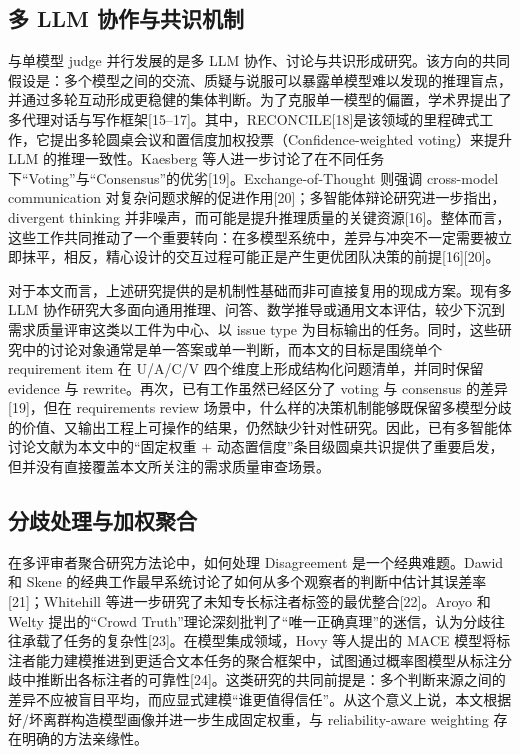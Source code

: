 \documentclass[a4paper,11pt]{ctexart}
\begin{document}
\subsection{多 LLM 协作与共识机制}
与单模型 judge 并行发展的是多 LLM 协作、讨论与共识形成研究。该方向的共同假设是：多个模型之间的交流、质疑与说服可以暴露单模型难以发现的推理盲点，并通过多轮互动形成更稳健的集体判断。为了克服单一模型的偏置，学术界提出了多代理对话与写作框架[15--17]。其中，RECONCILE[18]是该领域的里程碑式工作，它提出多轮圆桌会议和置信度加权投票（Confidence-weighted voting）来提升 LLM 的推理一致性。Kaesberg 等人进一步讨论了在不同任务下“Voting”与“Consensus”的优劣[19]。Exchange-of-Thought 则强调 cross-model communication 对复杂问题求解的促进作用[20]；多智能体辩论研究进一步指出，divergent thinking 并非噪声，而可能是提升推理质量的关键资源[16]。整体而言，这些工作共同推动了一个重要转向：在多模型系统中，差异与冲突不一定需要被立即抹平，相反，精心设计的交互过程可能正是产生更优团队决策的前提[16][20]。

对于本文而言，上述研究提供的是机制性基础而非可直接复用的现成方案。现有多 LLM 协作研究大多面向通用推理、问答、数学推导或通用文本评估，较少下沉到需求质量评审这类以工件为中心、以 issue type 为目标输出的任务。同时，这些研究中的讨论对象通常是单一答案或单一判断，而本文的目标是围绕单个 requirement item 在 U/A/C/V 四个维度上形成结构化问题清单，并同时保留 evidence 与 rewrite。再次，已有工作虽然已经区分了 voting 与 consensus 的差异[19]，但在 requirements review 场景中，什么样的决策机制能够既保留多模型分歧的价值、又输出工程上可操作的结果，仍然缺少针对性研究。因此，已有多智能体讨论文献为本文中的“固定权重 + 动态置信度”条目级圆桌共识提供了重要启发，但并没有直接覆盖本文所关注的需求质量审查场景。

\subsection{分歧处理与加权聚合}
在多评审者聚合研究方法论中，如何处理 Disagreement 是一个经典难题。Dawid 和 Skene 的经典工作最早系统讨论了如何从多个观察者的判断中估计其误差率[21]；Whitehill 等进一步研究了未知专长标注者标签的最优整合[22]。Aroyo 和 Welty 提出的“Crowd Truth”理论深刻批判了“唯一正确真理”的迷信，认为分歧往往承载了任务的复杂性[23]。在模型集成领域，Hovy 等人提出的 MACE 模型将标注者能力建模推进到更适合文本任务的聚合框架中，试图通过概率图模型从标注分歧中推断出各标注者的可靠性[24]。这类研究的共同前提是：多个判断来源之间的差异不应被盲目平均，而应显式建模“谁更值得信任”。从这个意义上说，本文根据好/坏离群构造模型画像并进一步生成固定权重，与 reliability-aware weighting 存在明确的方法亲缘性。
\end{document}
